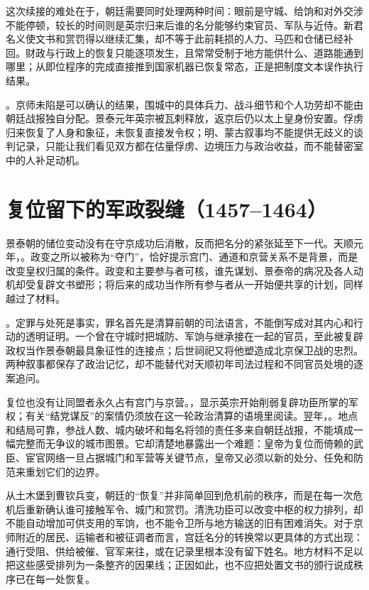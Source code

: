 这次续接的难处在于，朝廷需要同时处理两种时间：眼前是守城、给饷和对外交涉不能停顿，较长的时间则是英宗归来后谁的名分能够约束官员、军队与近侍。新君名义使文书和赏罚得以继续汇集，却不等于此前耗损的人力、马匹和仓储已经补回。财政与行政上的恢复只能逐项发生，且常常受制于地方能供什么、道路能通到哪里；从即位程序的完成直接推到国家机器已恢复常态，正是把制度文本误作执行结果。

。京师未陷是可以确认的结果，围城中的具体兵力、战斗细节和个人功劳却不能由朝廷战报独自分配。景泰元年英宗被瓦剌释放，返京后仍以太上皇身份安置。俘虏归来恢复了人身和象征，未恢复直接发令权；明、蒙古叙事均不能提供无歧义的谈判记录，只能让我们看见双方都在估量俘虏、边境压力与政治收益，而不能替密室中的人补足动机。

\section{复位留下的军政裂缝（1457--1464）}

景泰朝的储位变动没有在守京成功后消散，反而把名分的紧张延至下一代。天顺元年，。政变之所以被称为“夺门”，恰好提示宫门、通道和京营关系不是背景，而是改变皇权归属的条件。政变和主要参与者可核，谁先谋划、景泰帝的病况及各人动机却受复辟文书塑形；将后来的成功当作所有参与者从一开始便共享的计划，同样越过了材料。

。定罪与处死是事实，罪名首先是清算前朝的司法语言，不能倒写成对其内心和行动的透明证明。一个曾在守城时把城防、军饷与继承接在一起的官员，至此被复辟政权当作景泰朝最具象征性的连接点；后世祠祀又将他塑造成北京保卫战的忠烈。两种叙事都保存了政治记忆，却不能替代对天顺初年司法过程和不同官员处境的逐案追问。

复位也没有让同盟者永久占有宫门与京营。，显示英宗开始削弱复辟功臣所掌的军权；有关“结党谋反”的案情仍须放在这一轮政治清算的语境里阅读。翌年，。地点和结局可靠，参战人数、城内破坏和每名将领的责任多来自朝廷战报，不能填成一幅完整而无争议的城市图景。它却清楚地暴露出一个难题：皇帝为复位而倚赖的武臣、宦官网络一旦占据城门和军营等关键节点，皇帝又必须以新的处分、任免和防范来重划它们的边界。

从土木堡到曹钦兵变，朝廷的“恢复”并非简单回到危机前的秩序，而是在每一次危机后重新确认谁可接触军令、城门和赏罚。清洗功臣可以改变中枢的权力排列，却不能自动增加可供支用的军饷，也不能令卫所与地方输送的旧有困难消失。对于京师附近的居民、运输者和被征调者而言，宫廷名分的转换常以更具体的方式出现：通行受阻、供给被催、官军来往，或在记录里根本没有留下姓名。地方材料不足以把这些感受排列为一条整齐的因果线；正因如此，也不应把处置文书的颁行说成秩序已在每一处恢复。

